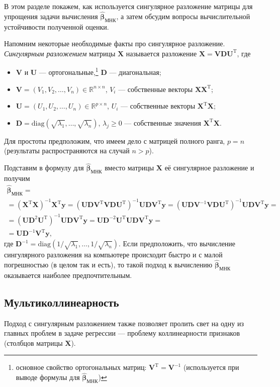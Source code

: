 \documentclass[12pt,a4paper,final]{article}
\newcommand{\betah}{\hat{\bm \beta}}
\newcommand{\XT}{{\bm{X}}^{\mathrm{T}}}
\newcommand{\X}{\bm{X}}
\newcommand{\y}{\bm{y}}
\newcommand{\1}{\mathds{1}}
\begin{document}
В этом разделе покажем, как используется сингулярное разложение матрицы для упрощения задачи вычисления $\betah_{\text{МНК}}$, а затем обсудим вопросы вычислительной устойчивости полученной оценки.

Напомним некоторые необходимые факты про сингулярное разложение. \textit{Сингулярным разложением} матрицы $\X$ называется разложение $\X = \bm V \bm D \bm U^\mathrm T$, где
\begin{itemize}
\item $\bm V$ и $\bm U$ --- ортогональные,\footnote{основное свойство ортогональных матриц: $\bm V^\mathrm T =\bm V^{-1}$ (используется при выводе формулы для $\betah_{\text{МНК}}$)} $\bm D$ --- диагональная;
\item $\bm V = (V_1, V_2, \ldots, V_n) \in \mathbb R^{n\times n}$, $V_i$ --- собственные векторы $\X \XT$;
\item $\bm U = (U_1, U_2, \ldots, U_n) \in \mathbb R^{p\times n}$, $U_i$ --- собственные векторы $\XT \X$;
\item $\bm D = \mathrm{diag}(\sqrt{\lambda_1}, \ldots,\sqrt{\lambda_n})$, $\lambda_j \geqslant 0$ --- собственные значения $\XT \X$.
\end{itemize}
Для простоты предположим, что имеем дело с матрицей полного ранга, $p = n$ (результаты распространяются на случай $n>p$).

Подставим в формулу для $\betah_{\text{МНК}}$ вместо матрицы $\X$ её сингулярное разложение и получим
\begin{multline}
  \label{eq:sing}
  \betah_{\text{МНК}} =\\= (\XT \X)^{-1}\XT \y = (\bm U \bm D \bm V^\mathrm T \bm V \bm D \bm U^\mathrm T)^{-1} \bm U \bm D \bm V^\mathrm T \y = (\bm U \bm D \bm V^{-1} \bm V \bm D \bm U^\mathrm T)^{-1} \bm U \bm D \bm V^\mathrm T \y = \\
  = (\bm U \bm D^2 \bm U^\mathrm T)^{-1} \bm U \bm D \bm V^\mathrm T \y = \bm U \bm D^{-2} \bm U^\mathrm T \bm U \bm D \bm V^\mathrm T \y =\\= \bm U \bm D^{-1} \bm V^\mathrm T \y,
\end{multline}
где $\bm D^{-1} = \mathrm{diag} (1/\sqrt{\lambda_1}, \ldots, 1/\sqrt{\lambda_n})$.
Если предположить, что вычисление сингулярного разложения на компьютере происходит быстро и с малой погрешностью (в целом так и есть), то такой подход к вычислению $\betah_{\text{МНК}}$ оказывается наиболее предпочтительным.

\subsection{Мультиколлинеарность} 
Подход с сингулярным разложением также позволяет пролить свет на одну из главных проблем в задаче регрессии --- проблему коллинеарности признаков (столбцов матрицы $\X$).
\end{document}
